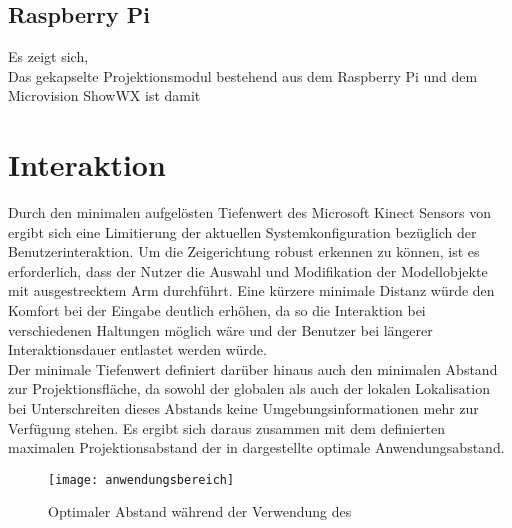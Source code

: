 \subsection{Raspberry Pi}
Es zeigt sich, \red[TODO]\\
Das gekapselte Projektionsmodul bestehend aus dem Raspberry Pi und dem Microvision ShowWX ist damit \\

\section{Interaktion}
Durch den minimalen aufgelösten Tiefenwert des Microsoft Kinect Sensors von \red[ABSTAND 0,5m?] ergibt sich eine Limitierung der aktuellen Systemkonfiguration bezüglich der Benutzerinteraktion. Um die Zeigerichtung robust erkennen zu können, ist es erforderlich, dass der Nutzer die Auswahl und Modifikation der Modellobjekte mit ausgestrecktem Arm durchführt. Eine kürzere minimale Distanz würde den Komfort bei der Eingabe deutlich erhöhen, da so die Interaktion bei verschiedenen Haltungen möglich wäre und der Benutzer bei längerer Interaktionsdauer entlastet werden würde.\\

Der minimale Tiefenwert definiert darüber hinaus auch den minimalen Abstand zur Projektionsfläche, da sowohl der globalen als auch der lokalen Lokalisation bei Unterschreiten dieses Abstands keine Umgebungsinformationen mehr zur Verfügung stehen. Es ergibt sich daraus zusammen mit dem definierten maximalen Projektionsabstand der in  dargestellte optimale Anwendungsabstand.\\

\begin{figure}[!ht]
	\begin{center}
		\texttt{[image: anwendungsbereich]}
		\caption{Optimaler Abstand während der Verwendung des }
		\label{fig.optdist}
	\end{center}
\end{figure}


